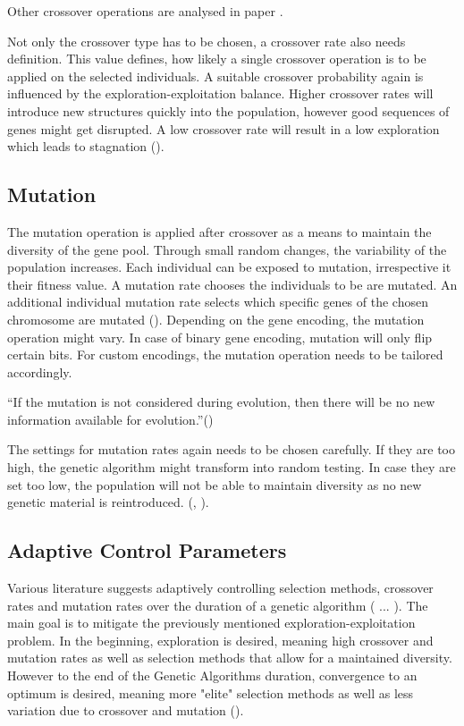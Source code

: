Other crossover operations are analysed in paper . 

Not only the crossover type has to be chosen, a crossover rate also needs definition. This value defines, how likely a single crossover operation is to be applied on the selected individuals.
A suitable crossover probability again is influenced by the exploration-exploitation balance. Higher crossover rates will introduce new structures quickly into the population, however good sequences of genes might get disrupted. A low crossover rate will result in a low exploration which leads to stagnation (\cite{grefenstette_optimization_1986}).

\subsection{Mutation}
The mutation operation is applied after crossover as a means to maintain the diversity of the gene pool. Through small random changes, the variability of the population increases. Each individual can be exposed to mutation, irrespective it their fitness value.
A mutation rate chooses the individuals to be are mutated. An additional individual mutation rate selects which specific genes of the chosen chromosome are mutated (\cite{srinivas_genetic_1994}). Depending on the gene encoding, the mutation operation might vary. In case of binary gene encoding, mutation will only flip certain bits. For custom encodings, the mutation operation needs to be tailored accordingly.

\enquote{If the mutation is not considered during evolution, then there will be no new information available for evolution.}(\cite{katoch_review_2021})

The settings for mutation rates again needs to be chosen carefully. If they are too high, the genetic algorithm might transform into random testing. In case they are set too low, the population will not be able to maintain diversity as no new genetic material is reintroduced. (\cite{klampfl_using_nodate}, \cite{grefenstette_optimization_1986}).

\subsection{Adaptive Control Parameters}
Various literature suggests adaptively controlling selection methods, crossover rates and mutation rates over the duration of a genetic algorithm ( ... ). The main goal is to mitigate the previously mentioned exploration-exploitation problem. In the beginning, exploration is desired, meaning high crossover and mutation rates as well as selection methods that allow for a maintained diversity. However to the end of the Genetic Algorithms duration, convergence to an optimum is desired, meaning more "elite" selection methods as well as less variation due to crossover and mutation (\cite{srinivas_genetic_1994}).


